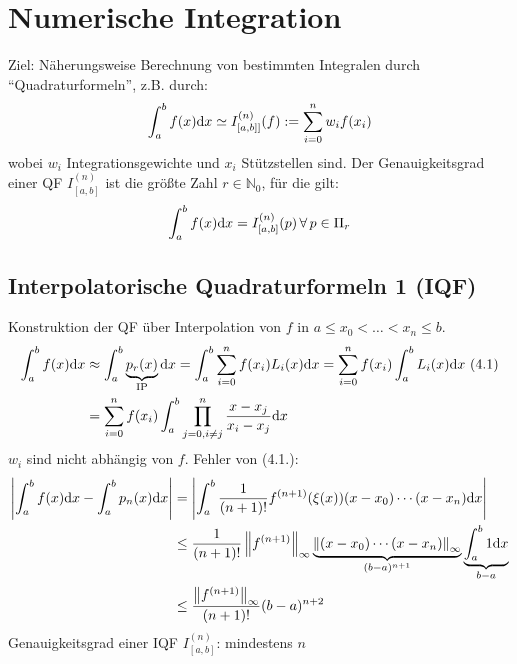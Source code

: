 \section{Numerische Integration}
Ziel: Näherungsweise Berechnung von bestimmten Integralen
durch ``Quadraturformeln'', z.B. durch:
\begin{align*}
  \int_a^b f(x) \mathrm{d}x \simeq I_{[a,b]]}^{(n)}(f) := \sum\limits_{i=0}^{n}{w_i f(x_i)}
\end{align*}
wobei $w_i$ Integrationsgewichte und $x_i$ Stützstellen sind.
 Der Genauigkeitsgrad einer QF $I_{[a,b]}^{(n)}$ ist
die größte Zahl $r \in \mathbb{N}_0$, für die gilt:
\begin{align*}
  \int_a^b f(x) \mathrm{d}x = I_{[a,b]}^{(n)}(p)\,\forall\,p \in \Pi_r
\end{align*}

\subsection{Interpolatorische Quadraturformeln 1 (IQF)}
Konstruktion der QF über Interpolation von $f$ in $a \leq x_0 < \ldots < x_n \leq b$.
\begin{align*}
  \int_a^b f(x) \mathrm{d}x &\approx \int_a^b \underbrace{p_r(x)}_{\text{IP}} \mathrm{d}x = 
  \int_a^b \sum\limits_{i=0}^{n}{f(x_i)L_i(x)\mathrm{d}x} = \sum\limits_{i=0}^{n}{f(x_i) \int_a^b L_i(x)\mathrm{d}x} \text{  (4.1)}\\
  &= \sum\limits_{i=0}^{n}{f(x_i) \int_a^b \prod_{j=0,i\neq j}^n \frac{x-x_j}{x_i - x_j}\mathrm{d}x}
\end{align*}
$w_i$ sind nicht abhängig von $f$. Fehler von (4.1.):
\begin{align*}
  \left| \int_a^b f(x)\mathrm{d}x - \int_a^b p_n(x)\mathrm{d}x \right| &= \left|  \int_a^b \frac{1}{(n+1)!} f^{(n+1)}(\xi(x))(x-x_0)\cdots(x-x_n)\mathrm{d}x \right|\\
  &\leq \frac{1}{(n+1)!} \left\lVert f^{(n+1)} \right\rVert_\infty \underbrace{\left\lVert (x-x_0)\cdots(x-x_n) \right\rVert_\infty}_{(b-a)^{n+1}} \underbrace{\int_a^b 1 \mathrm{d}x}_{b-a}\\
  &\leq \frac{\left\lVert f^{(n+1)} \right\rVert_\infty}{(n+1)!}(b-a)^{n+2}
\end{align*}
Genauigkeitsgrad einer IQF $I_{[a,b]}^{(n)}$: mindestens $n$
